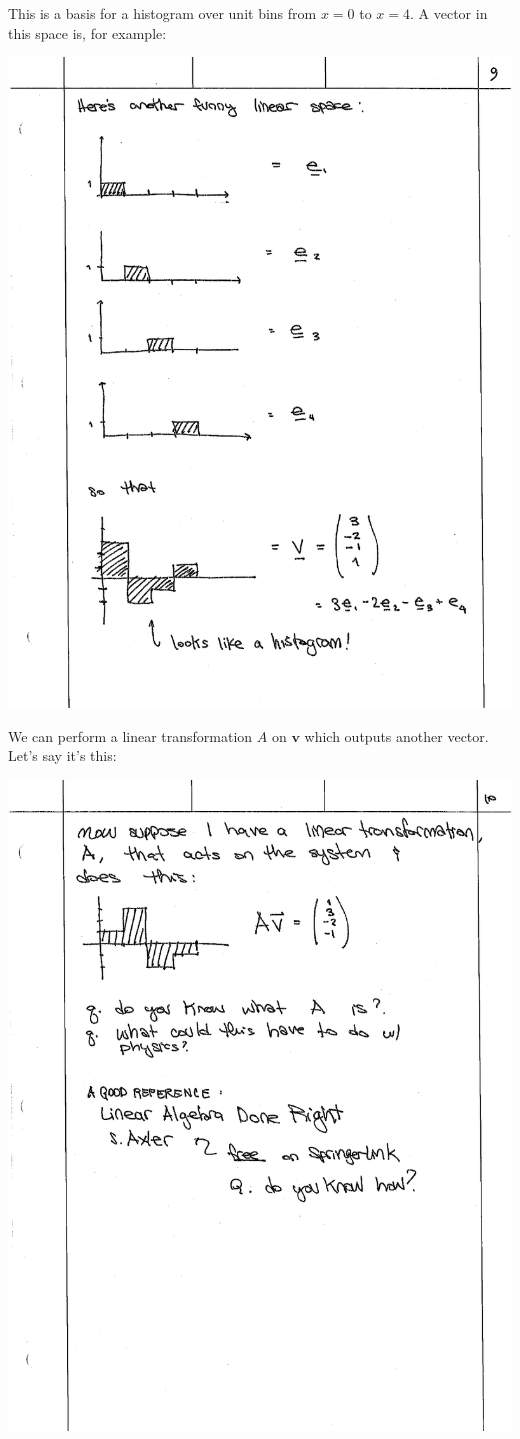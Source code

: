 \documentclass[12pt]{article}
\numberwithin{equation}{section}    %
\renewcommand{\vec}[1]{\mathbf{#1}} %
\begin{document}
This is a basis for a histogram over unit bins from $x=0$ to $x=4$. A vector in this space is, for example:

\begin{center}
\includegraphics[width=.8\textwidth]{figures/lec02_hist.pdf}
\end{center}

We can perform a linear transformation $A$ on $\vec{v}$ which outputs another vector. Let’s say it’s this:


\begin{center}
\includegraphics[width=.8\textwidth]{figures/lec02_hist2.pdf}
\end{center}
\end{document}
